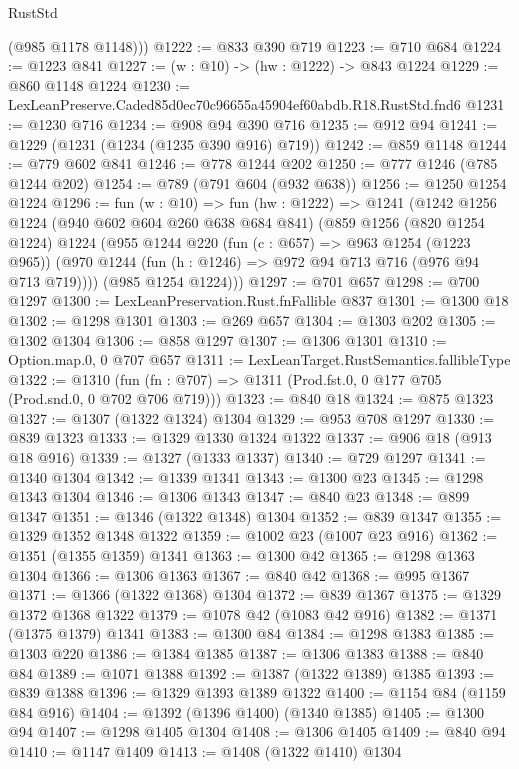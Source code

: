 \begin{lexlean}{RustStd}
\begin{coremodule}
        (@985 @1178 @1148)))
@1222 := @833 @390 @719
@1223 := @710 @684
@1224 := @1223 @841
@1227 := (w : @10) -> (hw : @1222) -> @843 @1224
@1229 := @860 @1148 @1224
@1230 := LexLeanPreserve.Caded85d0ec70c96655a45904ef60abdb.R18.RustStd.fnd6
@1231 := @1230 @716
@1234 := @908 @94 @390 @716
@1235 := @912 @94
@1241 := @1229 (@1231 (@1234 (@1235 @390 @916) @719))
@1242 := @859 @1148
@1244 := @779 @602 @841
@1246 := @778 @1244 @202
@1250 := @777 @1246 (@785 @1244 @202)
@1254 := @789 (@791 @604 (@932 @638))
@1256 := @1250 @1254 @1224
@1296 := fun (w : @10) =>
  fun (hw : @1222) =>
  @1241
    (@1242
      @1256
      @1224
      (@940 @602 @604 @260 @638 @684 @841)
      (@859
        @1256
        (@820 @1254 @1224)
        @1224
        (@955
          @1244
          @220
          (fun (c : @657) => @963 @1254 (@1223 @965))
          (@970 @1244 (fun (h : @1246) => @972 @94 @713 @716 (@976 @94 @713 @719))))
        (@985 @1254 @1224)))
@1297 := @701 @657
@1298 := @700 @1297
@1300 := LexLeanPreservation.Rust.fnFallible @837
@1301 := @1300 @18
@1302 := @1298 @1301
@1303 := @269 @657
@1304 := @1303 @202
@1305 := @1302 @1304
@1306 := @858 @1297
@1307 := @1306 @1301
@1310 := Option.map.{0, 0} @707 @657
@1311 := LexLeanTarget.RustSemantics.fallibleType
@1322 := @1310
    (fun (fn : @707) => @1311 (Prod.fst.{0, 0} @177 @705 (Prod.snd.{0, 0} @702 @706 @719)))
@1323 := @840 @18
@1324 := @875 @1323
@1327 := @1307 (@1322 @1324) @1304
@1329 := @953 @708 @1297
@1330 := @839 @1323
@1333 := @1329 @1330 @1324 @1322
@1337 := @906 @18 (@913 @18 @916)
@1339 := @1327 (@1333 @1337)
@1340 := @729 @1297
@1341 := @1340 @1304
@1342 := @1339 @1341
@1343 := @1300 @23
@1345 := @1298 @1343 @1304
@1346 := @1306 @1343
@1347 := @840 @23
@1348 := @899 @1347
@1351 := @1346 (@1322 @1348) @1304
@1352 := @839 @1347
@1355 := @1329 @1352 @1348 @1322
@1359 := @1002 @23 (@1007 @23 @916)
@1362 := @1351 (@1355 @1359) @1341
@1363 := @1300 @42
@1365 := @1298 @1363 @1304
@1366 := @1306 @1363
@1367 := @840 @42
@1368 := @995 @1367
@1371 := @1366 (@1322 @1368) @1304
@1372 := @839 @1367
@1375 := @1329 @1372 @1368 @1322
@1379 := @1078 @42 (@1083 @42 @916)
@1382 := @1371 (@1375 @1379) @1341
@1383 := @1300 @84
@1384 := @1298 @1383
@1385 := @1303 @220
@1386 := @1384 @1385
@1387 := @1306 @1383
@1388 := @840 @84
@1389 := @1071 @1388
@1392 := @1387 (@1322 @1389) @1385
@1393 := @839 @1388
@1396 := @1329 @1393 @1389 @1322
@1400 := @1154 @84 (@1159 @84 @916)
@1404 := @1392 (@1396 @1400) (@1340 @1385)
@1405 := @1300 @94
@1407 := @1298 @1405 @1304
@1408 := @1306 @1405
@1409 := @840 @94
@1410 := @1147 @1409
@1413 := @1408 (@1322 @1410) @1304

\end{coremodule}
\end{lexlean}
